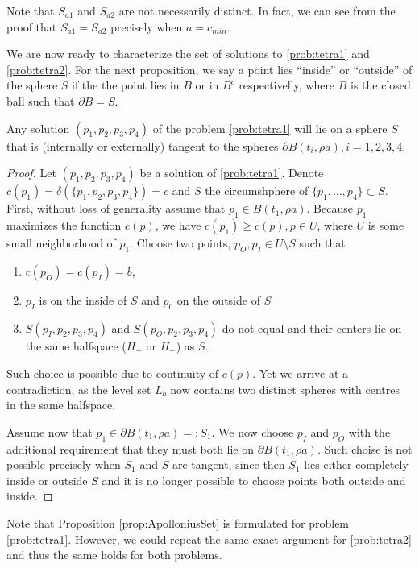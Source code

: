 Note that $S_{a1}$ and $S_{a2}$ are not necessarily distinct. In fact, we can see from the proof that $S_{a1}=S_{a2}$ precisely when $a=c_{min}$.


We are now ready to characterize the set of solutions to \ref{prob:tetra1} and \ref{prob:tetra2}. For the next proposition, we say a point lies ``inside'' or ``outside'' of the sphere $S$ if the the point lies in $B$ or in $B^c$ respectivelly, where $B$ is the closed ball such that $\partial B = S$.


\begin{proposition}\label{prop:ApolloniusSet}
Any solution $(p_1,p_2,p_3,p_4)$ of the problem \ref{prob:tetra1} will lie on a sphere $S$ that is (internally or externally) tangent to the spheres $\partial B(t_i,\rho a), i =1,2,3,4$. 
\end{proposition}
\begin{proof}
	Let $(p_1,p_2,p_3,p_4)$ be a solution of \ref{prob:tetra1}. Denote $c(p_1)=\delta(\{p_1,p_2,p_3,p_4\})=c$ and $S$ the circumshphere of $\{p_1,\dots,p_4\}\subset S$. 
	First, without loss of generality assume that $p_1 \in B(t_1,\rho a)$. Because $p_1$ maximizes the function $c(p)$, we have $c(p_1)\geq c(p), p\in U$, where $U$ is some small neighborhood of $p_1$. Choose two points, $p_O,p_I\in U\setminus S$ such that 
\begin{enumerate} 
\item $c(p_O)=c(p_I)=b$,
\item $p_I$ is on the inside of $S$ and $p_0$ on the outside of $S$ 
\item {}$S(p_I,p_2,p_3,p_4)$ and $S(p_O,p_2,p_3,p_4)$ do not equal and their centers lie on the same halfspace ($H_+$ or $H_-$) as $S$. 
\end{enumerate}
Such choice is possible due to continuity of $c(p)$. Yet we arrive at a contradiction, as the level set $L_b$ now contains two distinct spheres with centres in the same halfspace. 

Assume now that $p_1 \in \partial B(t_1,\rho a)=: S_1$. We now choose $p_I$ and $p_O$ with the additional requirement that they must both lie on $\partial B(t_1,\rho a)$. Such choise is not possible precisely when $S_1$ and $S$ are tangent, since then  $S_1$ lies either completely inside or outside $S$ and it is no longer possible to choose points both outside and inside. 
\end{proof}
Note that Proposition \ref{prop:ApolloniusSet} is formulated for problem \ref{prob:tetra1}. However, we could repeat the same exact argument for \ref{prob:tetra2} and thus the same holds for both problems.\newline

